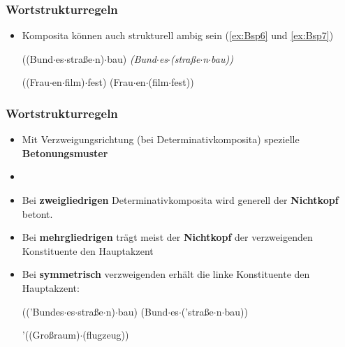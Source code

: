 \begin{frame}
\frametitle{Wortstrukturregeln}

\begin{itemize}
	\item Komposita können auch strukturell ambig sein (\ref{ex:Bsp6} und \ref{ex:Bsp7})
	
	\ea\label{ex:Bsp6} ((Bund$\cdot$es$\cdot$straße$\cdot$n)$\cdot$bau) \vs \emph{(Bund$\cdot$es$\cdot$(straße$\cdot$n$\cdot$bau))}
	\z
	
	\ea \label{ex:Bsp7} ((Frau$\cdot$en$\cdot$film)$\cdot$fest) \vs (Frau$\cdot$en$\cdot$(film$\cdot$fest))
	\z
	
\end{itemize}


\begin{minipage}{.48\textwidth}

\begin{figure}
\centering
{}
\end{figure}

\end{minipage}\hfill%
\begin{minipage}{.48\textwidth}

\begin{figure}
\centering
{}
\end{figure}

\end{minipage}


\end{frame}


\begin{frame}
\frametitle{Wortstrukturregeln}

\begin{itemize}
	\item Mit Verzweigungsrichtung (bei Determinativkomposita) \ras spezielle \textbf{Betonungsmuster}
	\item[]
	\item Bei \textbf{zweigliedrigen} Determinativkomposita wird generell der \textbf{Nichtkopf} betont.
	\item Bei \textbf{mehrgliedrigen} trägt meist der \textbf{Nichtkopf} der verzweigenden Konstituente den Hauptakzent
	\item Bei \textbf{symmetrisch} verzweigenden erhält die linke Konstituente den Hauptakzent:
	
	\ea (('Bundes$\cdot$es$\cdot$straße$\cdot$n)$\cdot$bau) \vs (Bund$\cdot$es$\cdot$('straße$\cdot$n$\cdot$bau))
	\z
	
	\ea '((Großraum)$\cdot$(flugzeug))
	\z
	
\end{itemize}


\end{frame}


